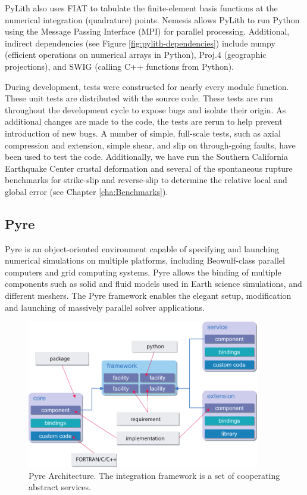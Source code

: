 PyLith also uses FIAT to tabulate the finite-element basis functions
at the numerical integration (quadrature) points. Nemesis allows PyLith
to run Python using the Message Passing Interface (MPI) for parallel
processing. Additional, indirect dependencies (see Figure \ref{fig:pylith-dependencies})
include numpy (efficient operations on numerical arrays in Python),
Proj.4 (geographic projections), and SWIG (calling C++ functions from
Python).

During development, tests were constructed for nearly every module
function. These unit tests are distributed with the source code. These
tests are run throughout the development cycle to expose bugs and
isolate their origin. As additional changes are made to the code,
the tests are rerun to help prevent introduction of new bugs. A number
of simple, full-scale tests, such as axial compression and extension,
simple shear, and slip on through-going faults, have been used to
test the code. Additionally, we have run the Southern California Earthquake
Center crustal deformation and several of the spontaneous rupture
benchmarks for strike-slip and reverse-slip to determine the relative
local and global error (see Chapter \ref{cha:Benchmarks}).


\subsection{Pyre}

Pyre is an object-oriented environment capable of specifying and launching
numerical simulations on multiple platforms, including Beowulf-class
parallel computers and grid computing systems. Pyre allows the binding
of multiple components such as solid and fluid models used in Earth
science simulations, and different meshers. The Pyre framework enables
the elegant setup, modification and launching of massively parallel
solver applications.

\noindent \begin{center}
\begin{figure}[H]
\begin{centering}
\includegraphics[width=4in]{intro/figs/pyre_overview}
\par\end{centering}

\caption{\label{fig:Pyre:Architecture}Pyre Architecture. The integration framework
is a set of cooperating abstract services.}
\end{figure}

\par\end{center}


